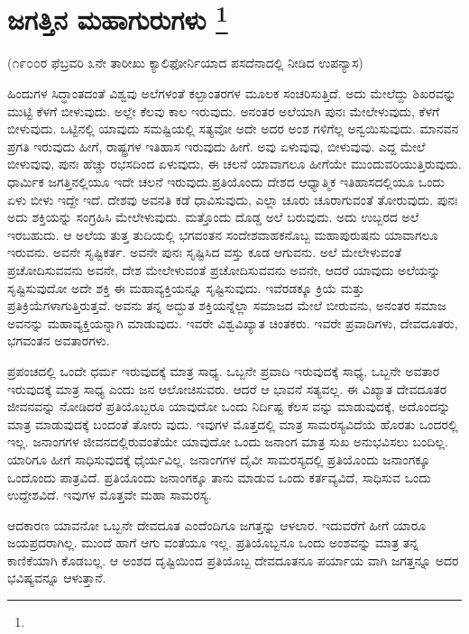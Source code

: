
\chapter[ಜಗತ್ತಿನ ಮಹಾಗುರುಗಳು]{ಜಗತ್ತಿನ ಮಹಾಗುರುಗಳು \protect\footnote{}}

\begin{center}
(೧೯೦೦ರ ಫೆಬ್ರವರಿ ೩ನೇ ತಾರೀಖು ಕ್ಯಾಲಿಫೋರ್ನಿಯಾದ ಪಸದೆನಾದಲ್ಲಿ ನೀಡಿದ ಉಪನ್ಯಾಸ)
\end{center}

ಹಿಂದುಗಳ ಸಿದ್ಧಾಂತದಂತೆ ವಿಶ್ವವು ಅಲೆಗಳಂತೆ ಕಲ್ಪಾಂತರಗಳ ಮೂಲಕ ಸಂಚರಿಸುತ್ತಿದೆ. ಅದು ಮೇಲೆದ್ದು ಶಿಖರವನ್ನು ಮುಟ್ಟಿ ಕೆಳಗೆ ಬೀಳುವುದು. ಅಲ್ಲೇ ಕೆಲವು ಕಾಲ ಇರುವುದು. ಅನಂತರ ಅಲೆಯಾಗಿ ಪುನಃ ಮೇಲೇಳುವುದು, ಕೆಳಗೆ ಬೀಳುವುದು. ಒಟ್ಟಿನಲ್ಲಿ ಯಾವುದು ಸಮಷ್ಟಿಯಲ್ಲಿ ಸತ್ಯವೋ ಅದೇ ಅದರ ಅಂಶ ಗಳಿಗೆಲ್ಲ ಅನ್ವಯಿಸುವುದು. ಮಾನವನ ಪ್ರಗತಿ ಇರುವುದು ಹೀಗೆ, ರಾಷ್ಟ್ರಗಳ ಇತಿಹಾಸ ಇರುವುದು ಹೀಗೆ. ಅವು ಏಳುವುವು, ಬೀಳುವುವು. ಎದ್ದ ಮೇಲೆ ಬೀಳುವುವು, ಪುನಃ ಹೆಚ್ಚು ರಭಸದಿಂದ ಏಳುವುದು, ಈ ಚಲನೆ ಯಾವಾಗಲೂ ಹೀಗೆಯೇ ಮುಂದುವರಿಯುತ್ತಿರುವುದು. ಧಾರ್ಮಿಕ ಜಗತ್ತಿನಲ್ಲಿಯೂ ಇದೇ ಚಲನೆ ಇರುವುದು.ಪ್ರತಿಯೊಂದು ದೇಶದ ಆಧ್ಯಾತ್ಮಿಕ ಇತಿಹಾಸದಲ್ಲಿಯೂ ಒಂದು ಏಳು ಬೀಳು ಇದ್ದೇ ಇದೆ. ದೇಶವು ಅವನತಿ ಕಡೆ ಧಾವಿಸುವುದು, ಎಲ್ಲಾ ಚೂರು ಚೂರಾಗುವಂತೆ ತೋರುವುದು. ಪುನಃ ಅದು ಶಕ್ತಿಯನ್ನು ಸಂಗ್ರಹಿಸಿ ಮೇಲೇಳುವುದು. ಮತ್ತೊಂದು ದೊಡ್ಡ ಅಲೆ ಬರುವುದು. ಅದು ಉಬ್ಬರದ ಅಲೆ ಇರಬಹುದು. ಆ ಅಲೆಯ ತುತ್ತ ತುದಿಯಲ್ಲಿ ಭಗವಂತನ ಸಂದೇಶವಾಹಕನೊಬ್ಬ ಮಹಾಪುರುಷನು ಯಾವಾಗಲೂ ಇರುವನು. ಅವನೇ ಸೃಷ್ಟಿಕರ್ತ. ಅವನೇ ಪುನಃ ಸೃಷ್ಟಿಸಿದ ವಸ್ತು ಕೂಡ ಆಗುವನು. ಅಲೆ ಮೇಲೇಳುವಂತೆ ಪ್ರಚೋದಿಸುವವನು ಅವನೇ, ದೇಶ ಮೇಲೇಳುವಂತೆ ಪ್ರಚೋದಿಸುವವನು ಅವನೇ, ಆದರೆ ಯಾವುದು ಅಲೆಯನ್ನು ಸೃಷ್ಟಿಸುವುದೋ ಅದೇ ಶಕ್ತಿ ಈ ಮಹಾವ್ಯಕ್ತಿಯನ್ನೂ ಸೃಷ್ಟಿಸುವುದು. ಇವೆರಡಕ್ಕೂ ಕ್ರಿಯೆ ಮತ್ತು ಪ್ರತಿಕ್ರಿಯೆಗಳಾಗುತ್ತಿರುತ್ತವೆ. ಅವನು ತನ್ನ ಅದ್ಭುತ ಶಕ್ತಿಯನ್ನೆಲ್ಲಾ ಸಮಾಜದ ಮೇಲೆ ಬೀರುವನು, ಅನಂತರ ಸಮಾಜ ಅವನನ್ನು ಮಹಾವ್ಯಕ್ತಿಯನ್ನಾಗಿ ಮಾಡುವುದು. ಇವರೇ ವಿಶ್ವವಿಖ್ಯಾತ ಚಿಂತಕರು. ಇವರೇ ಪ್ರವಾದಿಗಳು, ದೇವದೂತರು, ಭಗವಂತನ ಅವತಾರಗಳು.

ಪ್ರಪಂಚದಲ್ಲಿ ಒಂದೇ ಧರ್ಮ ಇರುವುದಕ್ಕೆ ಮಾತ್ರ ಸಾಧ್ಯ. ಒಬ್ಬನೇ ಪ್ರವಾದಿ ಇರುವುದಕ್ಕೆ ಸಾಧ್ಯ, ಒಬ್ಬನೇ ಅವತಾರ ಇರುವುದಕ್ಕೆ ಮಾತ್ರ ಸಾಧ್ಯ ಎಂದು ಜನ ಆಲೋಚಿಸುವರು. ಆದರೆ ಆ ಭಾವನೆ ಸತ್ಯವಲ್ಲ. ಈ ವಿಖ್ಯಾತ ದೇವದೂತರ ಜೀವನವನ್ನು ನೋಡಿದರೆ ಪ್ರತಿಯೊಬ್ಬರೂ ಯಾವುದೋ ಒಂದು ನಿರ್ದಿಷ್ಟ ಕೆಲಸ ವನ್ನು ಮಾಡುವುದಕ್ಕೆ, ಅದೊಂದನ್ನು ಮಾತ್ರ ಮಾಡುವುದಕ್ಕೆ ಬಂದಂತೆ ತೋರು ವುದು. ಇವುಗಳ ಮೊತ್ತದಲ್ಲಿ ಮಾತ್ರ ಸಾಮರಸ್ಯವಿದೆಯೆ ಹೊರತು ಒಂದರಲ್ಲಿ ಇಲ್ಲ. ಜನಾಂಗಗಳ ಜೀವನದಲ್ಲಿರುವಂತೆಯೇ ಯಾವುದೋ ಒಂದು ಜನಾಂಗ ಮಾತ್ರ ಸುಖ ಅನುಭವಿಸಲು ಬಂದಿಲ್ಲ. ಯಾರಿಗೂ ಹೀಗೆ ಸಾಧಿಸುವುದಕ್ಕೆ ಧೈರ್ಯವಿಲ್ಲ. ಜನಾಂಗಗಳ ದೈವೀ ಸಾಮರಸ್ಯದಲ್ಲಿ ಪ್ರತಿಯೊಂದು ಜನಾಂಗಕ್ಕೂ ಒಂದೊಂದು ಪಾತ್ರವಿದೆ. ಪ್ರತಿಯೊಂದು ಜನಾಂಗಕ್ಕೂ ತಾನು ಮಾಡುವ ಒಂದು ಕರ್ತವ್ಯವಿದೆ, ಸಾಧಿಸುವ ಒಂದು ಉದ್ದೇಶವಿದೆ. ಇವುಗಳ ಮೊತ್ತವೇ ಮಹಾ ಸಾಮರಸ್ಯ.

ಆದಕಾರಣ ಯಾವನೋ ಒಬ್ಬನೇ ದೇವದೂತ ಎಂದೆಂದಿಗೂ ಜಗತ್ತನ್ನು ಆಳಲಾರ. ಇದುವರೆಗೆ ಹೀಗೆ ಯಾರೂ ಜಯಪ್ರದರಾಗಿಲ್ಲ. ಮುಂದೆ ಹಾಗೆ ಆಗು ವಂತೆಯೂ ಇಲ್ಲ. ಪ್ರತಿಯೊಬ್ಬನೂ ಒಂದು ಅಂಶವನ್ನು ಮಾತ್ರ ತನ್ನ ಕಾಣಿಕೆಯಾಗಿ ಕೊಡಬಲ್ಲ. ಆ ಅಂಶದ ದೃಷ್ಟಿಯಿಂದ ಪ್ರತಿಯೊಬ್ಬ ದೇವದೂತನೂ ಪರ್ಯಾಯ ವಾಗಿ ಜಗತ್ತನ್ನೂ ಅದರ ಭವಿಷ್ಯವನ್ನೂ ಆಳುತ್ತಾನೆ.

